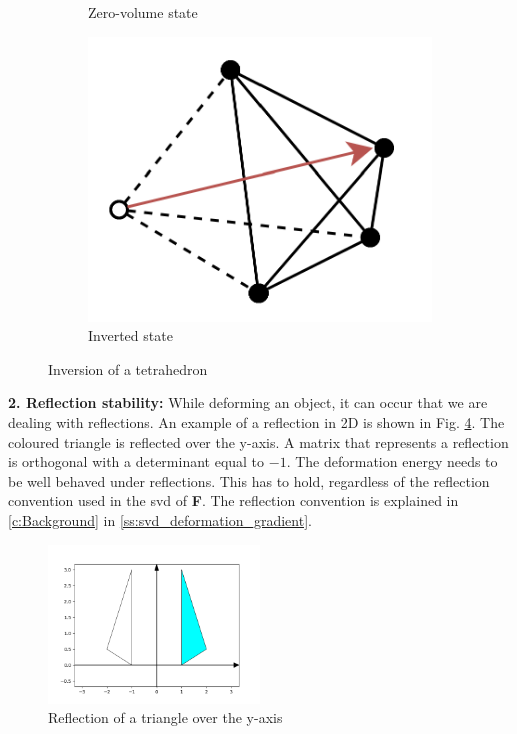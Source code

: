 {\begin{figure}[!ht]
\begin{subfigure}{.3\textwidth}
  \caption{Zero-volume state}
  \label{fig:inversion_2}
\end{subfigure}
\begin{subfigure}{.3\textwidth}
  \centering
  \includegraphics[width=.9\linewidth]{resources/stability_inversion_3.png}  
  \caption{Inverted state}
  \label{fig:inversion_3}
\end{subfigure}
\caption[Inversion of a tetrahedron]{Inversion of a tetrahedron}
\label{fig:inversion}
\end{figure}

\textbf{2. Reflection stability:} While deforming an object, it can occur that we are dealing with reflections. An example of a reflection in 2D is shown in Fig. \ref{fig:reflection}. The coloured triangle is reflected over the y-axis. A matrix that represents a reflection is orthogonal with a determinant equal to $-1$. The deformation energy needs to be well behaved under reflections. This has to hold, regardless of the reflection convention used in the \acrshort{svd} of \textbf{F}. The reflection convention is explained in \autoref{c:Background} in \autoref{ss:svd_deformation_gradient}.
\begin{figure}[!htbp]
	\centering
	\includegraphics[width=0.5\textwidth]{resources/reflection_plot.png}
	\caption[Reflection of a triangle over the y-axis]{Reflection of a triangle over the y-axis}
	\label{fig:reflection}
\end{figure}

}
